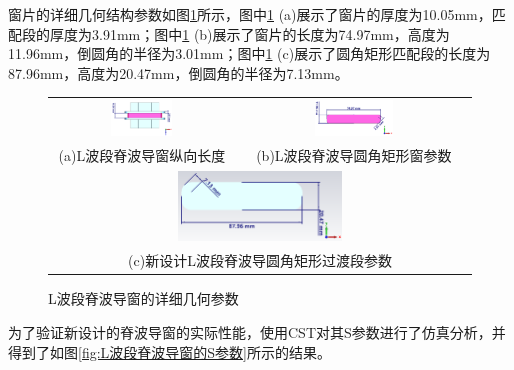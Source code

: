 \documentclass[master]{thesis-uestc}
\begin{document}
窗片的详细几何结构参数如图\ref{fig:L波段脊波导窗的详细几何参数}所示，图中\ref{fig:L波段脊波导窗的详细几何参数} (a)展示了窗片的厚度为10.05mm，匹配段的厚度为3.91mm；图中\ref{fig:L波段脊波导窗的详细几何参数} (b)展示了窗片的长度为74.97mm，高度为11.96mm，倒圆角的半径为3.01mm；图中\ref{fig:L波段脊波导窗的详细几何参数} (c)展示了圆角矩形匹配段的长度为87.96mm，高度为20.47mm，倒圆角的半径为7.13mm。
\begin{figure}[!htb]
    \small
    \centering
    \begin{tabular}{@{\ }c@{\ }c}
        \includegraphics[width=0.35\textwidth]{pic/chapter4/L波段脊波导窗纵向长度.png} & 
        \hspace{5pt}
        \includegraphics[width=0.35\textwidth]{pic/chapter4/L波段圆角矩形窗片尺寸.png}     \\
        \mbox{\small (a)L波段脊波导窗纵向长度}                                                                               & 
        \mbox{\small (b)L波段脊波导圆角矩形窗参数}                                                           \\[6bp]
        \multicolumn{2}{c}{\includegraphics[width=0.4\textwidth]{pic/chapter4/L波段过渡段尺寸.png}} \\  %
        \multicolumn{2}{c}{\mbox{\small (c)新设计L波段脊波导圆角矩形过渡段参数}}             
    \end{tabular}
    \caption{L波段脊波导窗的详细几何参数}
    \label{fig:L波段脊波导窗的详细几何参数}
\end{figure}

为了验证新设计的脊波导窗的实际性能，使用CST对其S参数进行了仿真分析，并得到了如图\ref{fig:L波段脊波导窗的S参数}所示的结果。
\end{document}
